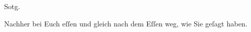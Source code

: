 \pstart
           So{\geminationn}tg.\pend
           
\pstart
           Nachher bei Euch eſſen und gleich nach dem Eſſen weg, wie Sie geſagt haben.\pend
           \endnumbering{}  \newcommand{\dateiname}{L01632}\newcommand{\titel}{Hugo von Hofmannsthal an Arthur Schnitzler, 14. 10. 1906}\newcommand{\editorInnen}{Martin Anton Müller und Gerd-Hermann Susen}

